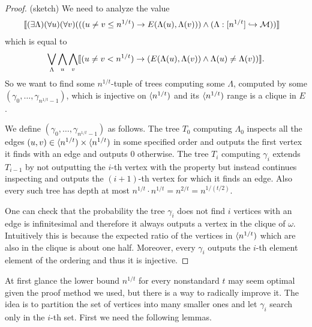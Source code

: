 \begin{proof}(sketch) We need to analyze the value
\begin{align}
&\llbracket(\exists \Lambda)(\forall u)(\forall v)(((u\not = v \leq n^{1/t})\to E(\Lambda(u),\Lambda(v)))\land(\Lambda:[n^{1/t}]\hookrightarrow\mathcal{M}))\rrbracket
\end{align}
which is equal to
\begin{align}
\bigvee_\Lambda\bigwedge_u\bigwedge_v\llbracket(u\not=v < n^{1/t})\to(E(\Lambda(u),\Lambda(v))\land\Lambda(u)\not=\Lambda(v))\rrbracket.
\end{align}
So we want to find some $n^{1/t}$-tuple of trees computing some $\Lambda$, computed by some $(\gamma_0,\dots,\gamma_{n^{1/t}-1})$, which is injective on $\langle n^{1/t})$ and its $\langle n^{1/t})$ range is a clique in $E$.

We define $(\gamma_0,\dots,\gamma_{n^{1/t}-1})$ as follows. The tree $T_0$ computing $\Lambda_0$ inspects all the edges $(u,v)\in\langle n^{1/t})\times\langle n^{1/t})$ in some specified order and outputs the first vertex it finds with an edge and outputs $0$ otherwise. The tree $T_i$ computing $\gamma_i$ extends $T_{i-1}$ by not outputting the $i$-th vertex with the property but instead continues inspecting and outputs the $(i+1)$-th vertex for which it finds an edge. Also every such tree has depth at most $n^{1/t}\cdot n^{1/t}=n^{2/t}=n^{1/(t/2)}$.

One can check that the probability the tree $\gamma_i$ does not find $i$ vertices with an edge is infinitesimal and therefore it always outputs a vertex in the clique of $\omega$. Intuitively this is because the expected ratio of the vertices in $\langle n^{1/t})$ which are also in the clique is about one half. Moreover, every $\gamma_i$ outputs the $i$-th element element of the ordering and thus it is injective.
\end{proof}

At first glance the lower bound $n^{1/t}$ for every nonstandard $t$ may seem optimal given the proof method we used, but there is a way to radically improve it. The idea is to partition the set of vertices into many smaller ones and let $\gamma_i$ search only in the $i$-th set. First we need the following lemmas.

